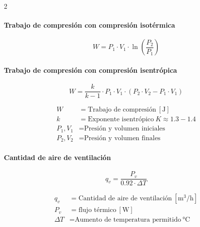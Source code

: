 \documentclass[11pt]{article}
\begin{document}
\begin{multicols*}{2}

    \paragraph*{Trabajo de compresión con compresión isotérmica}
    \begin{equation}
        W = P_1 \cdot V_1 \cdot \ln\left(\frac{P_2}{P_1}\right)
    \end{equation}

    \paragraph*{Trabajo de compresión con compresión isentrópica}

    \begin{equation}
        W = \frac{k}{k-1} \cdot P_1 \cdot V_1 \cdot \left( P_2 \cdot V_2 - P_1 \cdot V_1 \right)
    \end{equation}

    \begin{minipage}{\linewidth}
        \begin{align*}
            W &= \text{Trabajo de compresión} \ \mathrm{[J]} \\
            k &= \text{Exponente isentrópico} \ K \approx 1.3 - 1.4 \\
            P_1, V_1 &= \text{Presión y volumen iniciales} \\
            P_2, V_2 &= \text{Presión y volumen finales}
        \end{align*}
    \end{minipage}

    \paragraph*{Cantidad de aire de ventilación}

    \begin{equation}
        q_v = \frac{P_v}{0.92 \cdot \Delta T}
    \end{equation}

    \begin{minipage}{\linewidth}
        \begin{align*}
            q_v &= \text{Cantidad de aire de ventilación} \ \mathrm{[m^3/h]} \\
            P_v &= \text{flujo térmico} \ \mathrm{[W]} \\
            \Delta T &= \text{Aumento de temperatura permitido} \ \unit{\celsius}
        \end{align*}
        

\end{minipage}
\end{multicols*}
\end{document}

